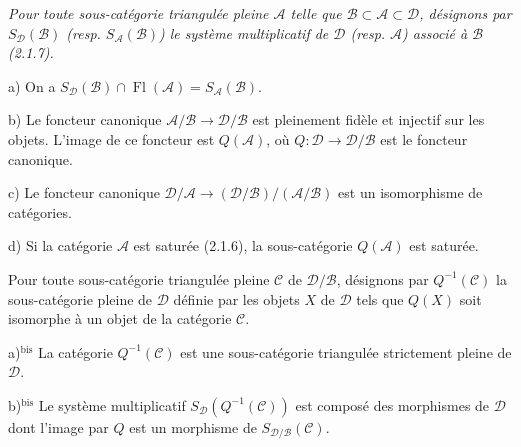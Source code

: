 \clearpage
{}%
\begingroup
\small
\setlength{\parskip}{0pt}%
\setlength{\emergencystretch}{1.5em}%

\begingroup\itshape
{}%
Pour toute sous-catégorie triangulée pleine $\mathcal A$ telle que
$\mathcal B\subset\mathcal A\subset\mathcal D$, désignons par
$S_{\mathcal D}(\mathcal B)$ (resp. $S_{\mathcal A}(\mathcal B)$) le
système multiplicatif de $\mathcal D$ (resp. $\mathcal A$) associé à
$\mathcal B$ (2.1.7).

\par\noindent a) On a
$S_{\mathcal D}(\mathcal B)\cap\operatorname{Fl}(\mathcal A)
=S_{\mathcal A}(\mathcal B)$.

\par\noindent b) Le foncteur canonique
$\mathcal A/\mathcal B\longrightarrow\mathcal D/\mathcal B$ est pleinement
fidèle et injectif sur les objets. L'image de ce foncteur est
$Q(\mathcal A)$, où
$Q\colon\mathcal D\longrightarrow\mathcal D/\mathcal B$ est le foncteur
canonique.

\par\noindent c) Le foncteur canonique
$\mathcal D/\mathcal A\longrightarrow
(\mathcal D/\mathcal B)/(\mathcal A/\mathcal B)$ est un isomorphisme de
catégories.

\par\noindent d) Si la catégorie $\mathcal A$ est saturée (2.1.6), la
sous-catégorie $Q(\mathcal A)$ est saturée.

Pour toute sous-catégorie triangulée pleine $\mathcal C$ de
$\mathcal D/\mathcal B$, désignons par $Q^{-1}(\mathcal C)$ la
sous-catégorie pleine de $\mathcal D$ définie par les objets $X$ de
$\mathcal D$ tels que $Q(X)$ soit isomorphe à un objet de la catégorie
$\mathcal C$.

\par\noindent a)$^{\mathrm{bis}}$ La catégorie $Q^{-1}(\mathcal C)$ est une
sous-catégorie triangulée strictement pleine de $\mathcal D$.

\par\noindent b)$^{\mathrm{bis}}$ Le système multiplicatif
$S_{\mathcal D}(Q^{-1}(\mathcal C))$ est composé des morphismes de
$\mathcal D$ dont l'image par $Q$ est un morphisme de
$S_{\mathcal D/\mathcal B}(\mathcal C)$.

